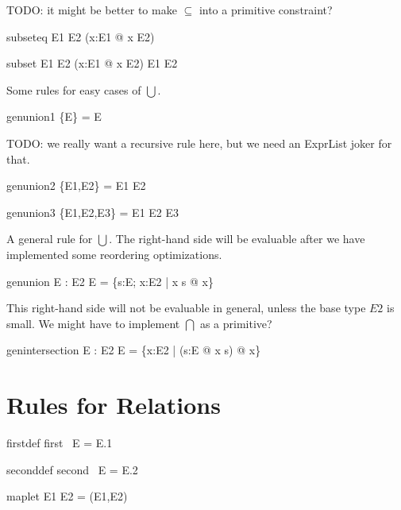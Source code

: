 \documentclass{article}
\begin{document}
TODO: it might be better to make $\subseteq$ into a primitive constraint?
\begin{zedrule}{subseteq}
   E1 \subseteq E2 \iff (\forall x:E1 @ x \in E2)
\end{zedrule}

\begin{zedrule}{subset}
   E1 \subset E2 \iff (\forall x:E1 @ x \in E2) \land E1 \neq E2
\end{zedrule}

Some rules for easy cases of $\bigcup$.
\begin{zedrule}{genunion1}
   \bigcup \{E\} = E
\end{zedrule}

TODO: we really want a recursive rule here,
but we need an ExprList joker for that.
\begin{zedrule}{genunion2}
   \bigcup \{E1,E2\} = E1 \cup E2
\end{zedrule}
\begin{zedrule}{genunion3}
   \bigcup \{E1,E2,E3\} = E1 \cup E2 \cup E3
\end{zedrule}

A general rule for $\bigcup$.
The right-hand side will be evaluable after we have implemented
some reordering optimizations. 
\begin{zedrule}{genunion}
   \proviso E : \power \power E2
\derives
   \bigcup E = \{s:E; x:E2 | x \in s @ x\}
\end{zedrule}

This right-hand side will not be evaluable in general,
unless the base type $E2$ is small.  We might have to
implement $\bigcap$ as a primitive?
\begin{zedrule}{genintersection}
   \proviso E : \power \power E2
\derives
   \bigcap E = \{x:E2 | (\forall s:E @ x \in s) @ x\}
\end{zedrule}


\section{Rules for Relations}

\begin{zedrule}{firstdef}
   first~ E = E.1
\end{zedrule}

\begin{zedrule}{seconddef}
   second~ E = E.2
\end{zedrule}

\begin{zedrule}{maplet}
   E1 \mapsto E2 = (E1,E2)
\end{zedrule}
\end{document}
